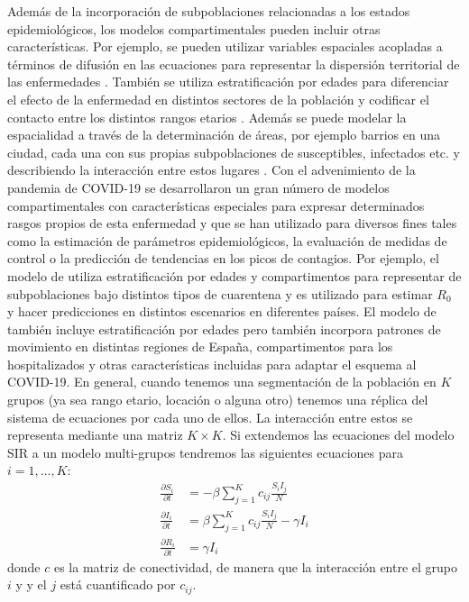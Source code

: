 Además de la incorporación de subpoblaciones relacionadas a los estados epidemiológicos, los modelos compartimentales pueden incluir otras características. Por ejemplo, se pueden utilizar variables espaciales acopladas a términos de difusión en las ecuaciones para representar la dispersión territorial de las enfermedades \citep{Noble1974}. También se utiliza estratificación por edades para diferenciar el efecto de la enfermedad en distintos sectores de la población y codificar el contacto entre los distintos rangos etarios \citep{Hethcote2000}. Además se puede modelar la espacialidad a través de la determinación de áreas, por ejemplo barrios en una ciudad, cada una con sus propias subpoblaciones de susceptibles, infectados etc. y describiendo la interacción entre estos lugares \citep{Klepac2018}. Con el advenimiento de la pandemia de COVID-19 se desarrollaron un gran número de modelos compartimentales con características especiales para expresar determinados rasgos propios de esta enfermedad y que se han utilizado para diversos fines tales como la estimación de parámetros epidemiológicos, la evaluación de medidas de control o la predicción de tendencias en los picos de contagios. Por ejemplo, el modelo de \cite{Evensen2020} utiliza estratificación por edades y compartimentos para representar de subpoblaciones bajo distintos tipos de cuarentena y es utilizado para estimar $R_0$ y hacer predicciones en distintos escenarios en diferentes países. El modelo de \cite{Arenas2020} también incluye estratificación por edades pero también incorpora patrones de movimiento en distintas regiones de España, compartimentos para los hospitalizados y otras características incluidas para adaptar el esquema al COVID-19. En general, cuando tenemos una segmentación de la población en $K$ grupos (ya sea rango etario, locación o alguna otro) tenemos una réplica del sistema de ecuaciones por cada uno de ellos. La interacción entre estos se representa mediante una matriz $K \times K$. Si extendemos las ecuaciones del modelo SIR a un modelo multi-grupos tendremos las siguientes ecuaciones para $i=1, ..., K$:
\begin{align}
    \frac{\partial S_i}{\partial t} &= -\beta \sum_{j=1}^{K}c_{ij}\frac{S_i I_j}{N}\\
    \frac{\partial I_i}{\partial t} &= \beta \sum_{j=1}^{K}c_{ij}\frac{S_i I_j}{N} - \gamma I_i \\
    \frac{\partial R_i}{\partial t} &= \gamma I_i
\end{align}
donde $c$ es la matriz de conectividad, de manera que la interacción entre el grupo $i$ y y el $j$ está cuantificado por $c_{ij}$.

